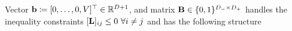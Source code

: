 Vector $\mathbf{b}\coloneqq[0,\ldots,0,V]^\top\in\mathbb{R}^{D+1}$, and matrix $\mathbf{B}\in\{0,1\}^{D_-\times D_+}$ handles the inequality constraints $[\mathbf{L}]_{ij}\leq0\ \forall i\neq j$ and has the following structure
